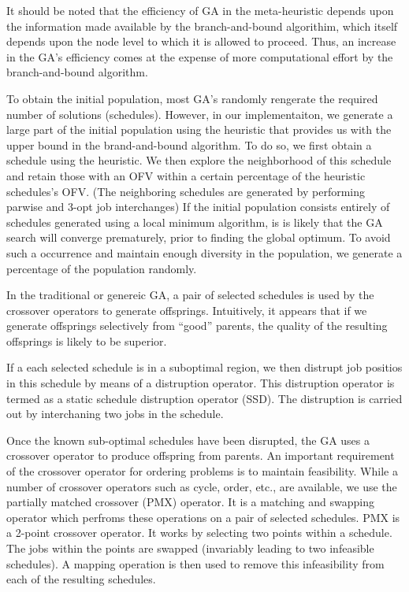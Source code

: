 \documentclass[pdftex,11pt]{article}
\begin{document}
It should be noted that the efficiency of GA in the meta-heuristic depends upon the information made available by the branch-and-bound algorithim, which itself depends upon the
node level to which it is allowed to proceed. Thus, an increase in the GA's efficiency
comes at the expense of more computational effort by the branch-and-bound algorithm.

To obtain the initial population, most GA's randomly rengerate the required number of solutions (schedules). However, in our implementaiton, we generate a large part of the initial population using the heuristic that provides us with the upper bound in the brand-and-bound algorithm. To do so, we first obtain a schedule using the heuristic. We then explore the neighborhood of this schedule and retain those with an OFV within a certain percentage of the heuristic schedules's OFV. (The neighboring schedules are generated by performing parwise and 3-opt job interchanges) If the initial population consists entirely of schedules generated using a local minimum algorithm, is is likely that the GA search will converge prematurely, prior to finding the global optimum. To avoid such a occurrence and maintain enough diversity in the population, we generate a percentage of the population randomly.

In the traditional or genereic GA, a pair of selected schedules is used by the crossover operators to generate offsprings. Intuitively, it appears that if we generate offsprings selectively from ``good'' parents, the quality of the resulting offsprings is likely to be superior.

If a each selected schedule is in a suboptimal region, we then distrupt job positios in this schedule by means of a distruption operator. This distruption operator is termed as a static schedule distruption operator (SSD). The distruption is carried out by interchaning two jobs in the schedule.

Once the known sub-optimal schedules have been disrupted, the GA uses a crossover operator to produce offspring from parents. An important requirement of the crossover operator for ordering problems is to maintain feasibility. While a number of crossover operators such as cycle, order, etc., are available, we use the partially matched crossover (PMX) operator. It is a matching and swapping operator which perfroms these operations on a pair of selected schedules. PMX is a 2-point crossover operator. It works by selecting two points within a schedule. The jobs within the points are swapped (invariably leading to two infeasible schedules). A mapping operation is then used to remove this infeasibility from each of the resulting schedules.
\end{document}
